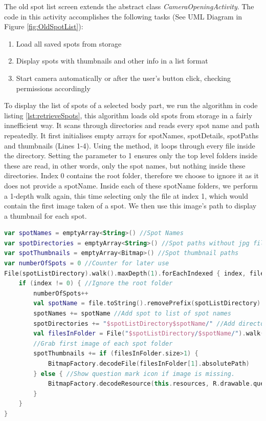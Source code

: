 The old spot list screen extends the abstract class \emph{CameraOpeningActivity}. The code in this activity accomplishes the following tasks (See UML Diagram in Figure \ref{fig:OldSpotList}):
\begin{enumerate}
    \item Load all saved spots from storage
    \item Display spots with thumbnails and other info in a list format
    \item Start camera automatically or after the user's button click, checking permissions accordingly
\end{enumerate}
To display the list of spots of a selected body part, we run the algorithm in code listing \ref{lst:retrieveSpots}, this algorithm loads old spots from storage in a fairly innefficient way. It scans through directories and reads every spot name and path repeatedly. It first initialises empty arrays for spotNames, spotDetails, spotPaths and thumbnails (Lines 1-4). Using the    method, it loops through every file inside the  directory. Setting the  parameter to 1 ensures only the top level folders inside these are read, in other words, only the spot names, but nothing inside these directories. Index 0 contains the root folder, therefore we choose to ignore it as it does not provide a spotName. Inside each of these spotName folders, we perform a 1-depth walk again, this time selecting only the file at index 1, which would contain the first image taken of a spot. We then use this image's path to display a thumbnail for each spot.


\clearpage
\begin{lstlisting}[caption={Loading Old Spots}, label={lst:retrieveSpots}, language=Kotlin]
var spotNames = emptyArray<String>() //Spot Names
var spotDirectories = emptyArray<String>() //Spot paths without jpg file
var spotThumbnails = emptyArray<Bitmap>() //Spot thumbnail paths
var numberOfSpots = 0 //Counter for later use
File(spotListDirectory).walk().maxDepth(1).forEachIndexed { index, file ->
    if (index != 0) { //Ignore the root folder
        numberOfSpots++
        val spotName = file.toString().removePrefix(spotListDirectory)
        spotNames += spotName //Add spot to list of spot names
        spotDirectories += "$spotListDirectory$spotName/" //Add directory
        val filesInFolder = File("$spotListDirectory/$spotName/").walk().maxDepth(1).toList()
        //Grab first image of each spot folder
        spotThumbnails += if (filesInFolder.size>1) {
            BitmapFactory.decodeFile(filesInFolder[1].absolutePath)
        } else { //Show question mark icon if image is missing.
            BitmapFactory.decodeResource(this.resources, R.drawable.questionmark)
        }
    }
}
\end{lstlisting}

